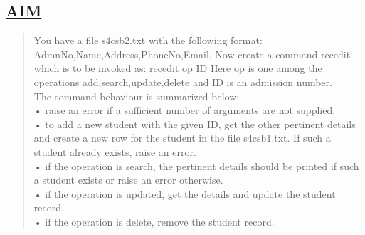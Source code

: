 \documentclass[a4paper, 12pt]{article}
\begin{document}
\subsection*{\underline{AIM}}
\begin{quote}
You have a file s4csb2.txt with the following format:
AdmnNo,Name,Address,PhoneNo,Email.
Now create a command recedit which is to be invoked as:
recedit op ID
Here op is one among the operations add,search,update,delete and ID is an admission
number.\\
The command behaviour is summarized below:\\
• raise an error if a sufficient number of arguments are not supplied.\\
• to add a new student with the given ID, get the other pertinent details and create a new row for the student in the file s4csb1.txt. If such a student already exists, raise an error.\\
• if the operation is search, the pertinent details should be printed if such a student exists or
raise an error otherwise.\\
• if the operation is updated, get the details and update the student record.\\
• if the operation is delete, remove the student record.
\end{quote}
\end{document}

